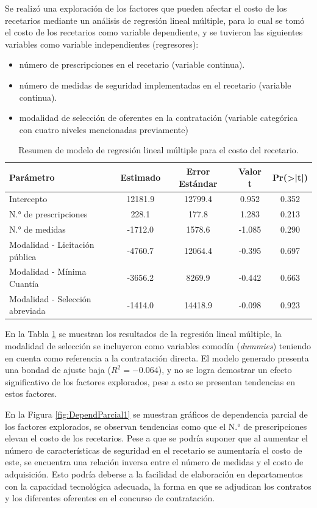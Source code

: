 \documentclass[
]{book}
\begin{document}
Se realizó una exploración de los factores que pueden afectar el costo de los recetarios mediante un análisis de regresión lineal múltiple, para lo cual se tomó el costo de los recetarios como variable dependiente, y se tuvieron las siguientes variables como variable independientes (regresores):

\begin{itemize}
\item
  número de prescripciones en el recetario (variable continua).
\item
  número de medidas de seguridad implementadas en el recetario (variable continua).
\item
  modalidad de selección de oferentes en la contratación (variable categórica con cuatro niveles mencionadas previamente)
\end{itemize}

\begin{table}

\caption{\label{tab:resumenModeloRegresionLineal}Resumen de modelo de regresión lineal múltiple para el costo del recetario.}
\centering
\begin{tabular}[t]{lcccc}
\toprule
Parámetro & Estimado & Error Estándar & Valor t & Pr(>|t|)\\
\midrule
Intercepto & 12181.9 & 12799.4 & 0.952 & 0.352\\
N.° de prescripciones & 228.1 & 177.8 & 1.283 & 0.213\\
N.° de medidas & -1712.0 & 1578.6 & -1.085 & 0.290\\
Modalidad - Licitación pública & -4760.7 & 12064.4 & -0.395 & 0.697\\
Modalidad - Mínima Cuantía & -3656.2 & 8269.9 & -0.442 & 0.663\\
\addlinespace
Modalidad - Selección abreviada & -1414.0 & 14418.9 & -0.098 & 0.923\\
\bottomrule
\end{tabular}
\end{table}

En la Tabla \ref{tab:resumenModeloRegresionLineal} se muestran los resultados de la regresión lineal múltiple, la modalidad de selección se incluyeron como variables comodín (\emph{dummies}) teniendo en cuenta como referencia a la contratación directa. El modelo generado presenta una bondad de ajuste baja (\(R^{2} = -0.064\)), y no se logra demostrar un efecto significativo de los factores explorados, pese a esto se presentan tendencias en estos factores.

En la Figura \ref{fig:DependParcial1} se muestran gráficos de dependencia parcial de los factores explorados, se observan tendencias como que el N.° de prescripciones elevan el costo de los recetarios. Pese a que se podría suponer que al aumentar el número de características de seguridad en el recetario se aumentaría el costo de este, se encuentra una relación inversa entre el número de medidas y el costo de adquisición. Esto podría deberse a la facilidad de elaboración en departamentos con la capacidad tecnológica adecuada, la forma en que se adjudican los contratos y los diferentes oferentes en el concurso de contratación.
\end{document}
